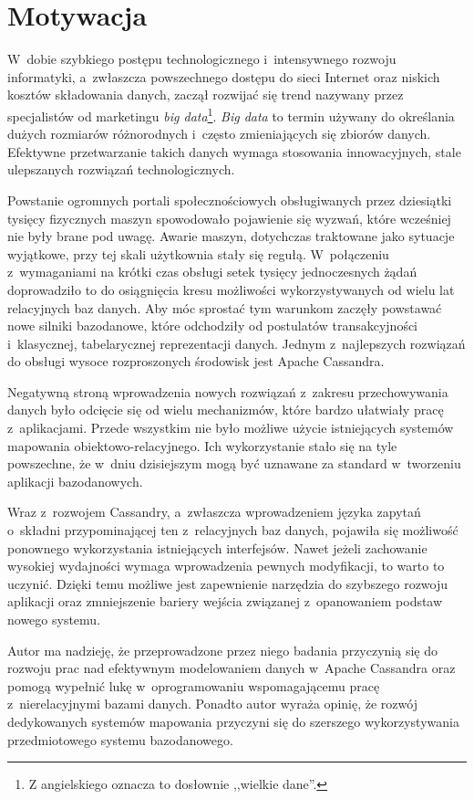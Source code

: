 \section{Motywacja}
\label{sec:motivation}

W~dobie szybkiego postępu technologicznego i~intensywnego rozwoju informatyki, a~zwłaszcza powszechnego dostępu do sieci Internet oraz niskich kosztów składowania danych, zaczął rozwijać się trend nazywany przez specjalistów od marketingu \emph{big data}\footnote{Z angielskiego oznacza to dosłownie ,,wielkie dane''.}. \emph{Big data} to termin używany do określania dużych rozmiarów różnorodnych i~często zmieniających się zbiorów danych.~\cite{big_data_definition} Efektywne przetwarzanie takich danych wymaga stosowania innowacyjnych, stale ulepszanych rozwiązań technologicznych. 

Powstanie ogromnych portali społecznościowych obsługiwanych przez dziesiątki tysięcy fizycznych maszyn spowodowało pojawienie się wyzwań, które wcześniej nie były brane pod uwagę. Awarie maszyn, dotychczas traktowane jako sytuacje wyjątkowe, przy tej skali użytkownia stały się regułą. W~połączeniu z~wymaganiami na krótki czas obsługi setek tysięcy jednoczesnych żądań doprowadziło to do osiągnięcia kresu możliwości wykorzystywanych od wielu lat relacyjnych baz danych. Aby móc sprostać tym warunkom zaczęły powstawać nowe silniki bazodanowe, które odchodziły od postulatów transakcyjności i~klasycznej, tabelarycznej reprezentacji danych. Jednym z~najlepszych rozwiązań do obsługi wysoce rozproszonych środowisk jest Apache Cassandra.

Negatywną stroną wprowadzenia nowych rozwiązań z~zakresu przechowywania danych było odcięcie się od wielu mechanizmów, które bardzo ułatwiały pracę z~aplikacjami. Przede wszystkim nie było możliwe użycie istniejących systemów mapowania obiektowo-relacyjnego. Ich wykorzystanie stało się na tyle powszechne, że w~dniu dzisiejszym mogą być uznawane za standard w~tworzeniu aplikacji bazodanowych.

Wraz z~rozwojem Cassandry, a~zwłaszcza wprowadzeniem języka zapytań o~składni przypominającej ten z~relacyjnych baz danych, pojawiła się możliwość ponownego wykorzystania istniejących interfejsów. Nawet jeżeli zachowanie wysokiej wydajności wymaga wprowadzenia pewnych modyfikacji, to warto to uczynić. Dzięki temu możliwe jest zapewnienie narzędzia do szybszego rozwoju aplikacji oraz zmniejszenie bariery wejścia związanej z~opanowaniem podstaw nowego systemu.

Autor ma nadzieję, że przeprowadzone przez niego badania przyczynią się do rozwoju prac nad efektywnym modelowaniem danych w~Apache Cassandra oraz pomogą wypełnić lukę w~oprogramowaniu wspomagającemu pracę z~nierelacyjnymi bazami danych. Ponadto autor wyraża opinię, że rozwój dedykowanych systemów mapowania przyczyni się do szerszego wykorzystywania przedmiotowego systemu bazodanowego.

